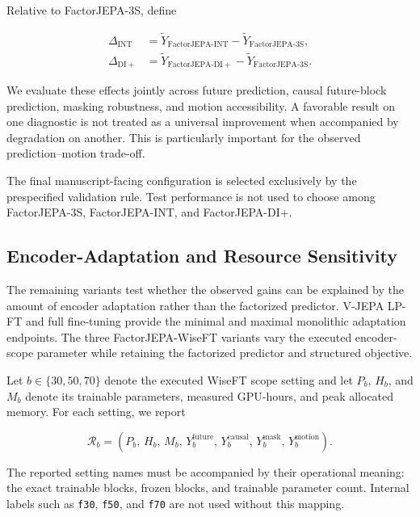 Relative to FactorJEPA-3S, define

\begin{equation*}
\begin{aligned}
\Delta_{\mathrm{INT}}
&=
\widetilde Y_{\mathrm{FactorJEPA\text{-}INT}}
-
\widetilde Y_{\mathrm{FactorJEPA\text{-}3S}},
\\
\Delta_{\mathrm{DI+}}
&=
\widetilde Y_{\mathrm{FactorJEPA\text{-}DI+}}
-
\widetilde Y_{\mathrm{FactorJEPA\text{-}3S}}.
\end{aligned}
\end{equation*}

We evaluate these effects jointly across future prediction,
causal future-block prediction, masking robustness, and motion accessibility.
A favorable result on one diagnostic is not treated as a universal
improvement when accompanied by degradation on another. This is
particularly important for the observed prediction--motion trade-off.

The final manuscript-facing configuration is selected exclusively by
the prespecified validation rule. Test performance is not used to
choose among FactorJEPA-3S, FactorJEPA-INT, and FactorJEPA-DI+.


\subsection{Encoder-Adaptation and Resource Sensitivity}
\label{app:attribution_encoder_scope}

The remaining variants test whether the observed gains can be
explained by the amount of encoder adaptation rather than the
factorized predictor. V-JEPA LP-FT and full fine-tuning provide the
minimal and maximal monolithic adaptation endpoints. The three
FactorJEPA-WiseFT variants vary the executed encoder-scope parameter
while retaining the factorized predictor and structured objective.

Let \(b\in\{30,50,70\}\) denote the executed WiseFT scope setting and
let \(P_b\), \(H_b\), and \(M_b\) denote its trainable parameters,
measured GPU-hours, and peak allocated memory. For each setting, we
report

\begin{equation*}
\mathcal R_b
=
\left(
P_b,\,
H_b,\,
M_b,\,
Y_b^{\mathrm{future}},\,
Y_b^{\mathrm{causal}},\,
Y_b^{\mathrm{mask}},\,
Y_b^{\mathrm{motion}}
\right).
\end{equation*}

The reported setting names must be accompanied by their operational
meaning: the exact trainable blocks, frozen blocks, and trainable
parameter count. Internal labels such as \texttt{f30},
\texttt{f50}, and \texttt{f70} are not used without this mapping.

